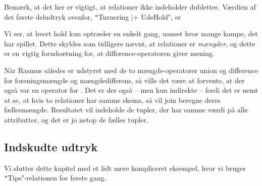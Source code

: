 \documentclass{article}
\newcounter{eks}
\begin{document}

Bem\ae{}rk, at det her er vigtigt, at relationer ikke indeholder dubletter.
V\ae{}rdien af det f\o{}rste deludtryk ovenfor,
\texttt"Turnering |+ UdeHold", er
\begin{center}
\end{center}
Vi ser, at hvert hold kun optr\ae{}der en enkelt gang, uanset hvor mange
kampe, det har spillet. Dette skyldes som tidligere n\ae{}vnt, at
relationer er {\em m\ae{}ngder}, og dette er en vigtig foruds\ae{}tning
for, at difference-operatoren giver mening.

N\aa{}r {\sc Rasmus} s\aa{}ledes er udstyret med de to m\ae{}ngde-operatorer
union og difference for foreningsm\ae{}ngde og m\ae{}ngdedifferens, s\aa{}
ville det v\ae{}re at forvente, at der ogs\aa{} var en operator for
. Det er der ogs\aa{} -- men kun indirekte -- fordi
det er nemt at se, at hvis to relationer har samme skema, s\aa{} vil
join beregne deres f\ae{}llesm\ae{}ngde. Resultatet vil indeholde
de tupler, der har samme v\ae{}rdi p\aa{} alle attributter, og det er jo
netop de f\ae{}lles tupler.

\subsection{Indskudte udtryk}
Vi slutter dette kapitel med et lidt mere kompliceret eksempel, hvor
vi bruger \texttt"Tips"-relationen for f\o{}rste gang.

\end{document}
